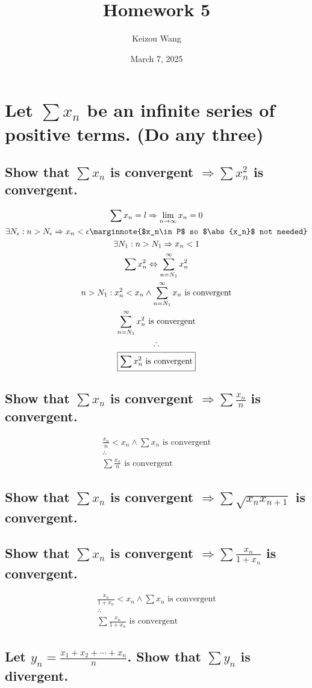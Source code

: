 \documentclass[letterpaper]{article}
\title{Homework 5}
\author{Keizou Wang}
\date{March 7, 2025}
\DeclarePairedDelimiter\abs{\lvert}{\rvert}
\begin{document}
\maketitle

\section{Let $\sum x_n$ be an infinite series of positive terms. (\textbf{Do any three})}
\subsection{Show that $\sum x_n$ is convergent $\Rightarrow\sum x_n^2$ is convergent.}
\begin{gather*}
\sum x_n=l\Rightarrow \lim_{n\rightarrow\infty}x_n=0 \\
\exists N_\epsilon:n>N_\epsilon\Rightarrow x_n<\epsilon \marginnote{$x_n\in P$ so $\abs{x_n}$ not needed} \\
\exists N_1:n>N_1\Rightarrow x_n<1 \\
\sum x_n^2\Leftrightarrow\sum_{n=N_1}^{\infty}x_n^2 \\
n>N_1:x_n^2<x_n\land\sum_{n=N_1}^{\infty}x_n\text{ is convergent} \\
\sum_{n=N_1}^{\infty}x_n^2\text{ is convergent} \\
\therefore \\
\boxed{\sum x_n^2\text{ is convergent}}
\end{gather*}
\subsection{Show that $\sum x_n$ is convergent $\Rightarrow\sum \frac{x_n}{n}$ is convergent.}
\begin{gather*}
\frac{x_n}{n}<x_n \land \sum x_n \text{ is convergent} \\
\therefore \\
\boxed{\sum\frac{x_n}{n}\text{ is convergent}}
\end{gather*}
\subsection{Show that $\sum x_n$ is convergent $\Rightarrow\sum \sqrt{x_nx_{n+1}}$ is convergent.}
\begin{center}\end{center}
\subsection{Show that $\sum x_n$ is convergent $\Rightarrow\sum \frac{x_n}{1+x_n}$ is convergent.}
\begin{gather*}
\frac{x_n}{1+x_n}<x_n \land \sum x_n \text{ is convergent} \\
\therefore \\
\boxed{\sum\frac{x_n}{1+x_n}\text{ is convergent}}
\end{gather*}
\subsection{Let $y_n=\frac{x_1+x_2+\dotsb+x_n}{n}$. Show that $\sum y_n$ is divergent.}
\end{document}
